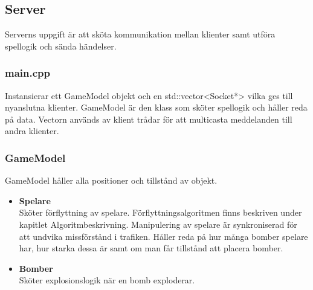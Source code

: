 \documentclass[10pt, titlepage, oneside, a4paper]{article}
\begin{document}
    	\newpage
    	\subsection{Server}
    	Serverns uppgift är att sköta kommunikation mellan klienter samt utföra spellogik och sända händelser.

    		\subsubsection{main.cpp}
    		Instansierar ett GameModel objekt och en std::vector<Socket*> vilka ges till nyanslutna klienter. GameModel är den klass som sköter spellogik och håller reda på data. Vectorn används av klient trådar för att multicasta meddelanden till andra klienter.
    		
    		\subsubsection{GameModel}
    		GameModel håller alla positioner och tillstånd av objekt. 
    		\begin{itemize}
    			\item\textbf{Spelare}\\Sköter förflyttning av spelare. Förflyttningsalgoritmen finns beskriven under kapitlet Algoritmbeskrivning. Manipulering av spelare är synkroniserad för att undvika missförstånd i trafiken. Håller reda på hur många bomber spelare har, hur starka dessa är samt om man får tillstånd att placera bomber.
    			\item\textbf{Bomber}\\Sköter explosionslogik när en bomb exploderar. 
    		\end{itemize}
    	
\end{document}
